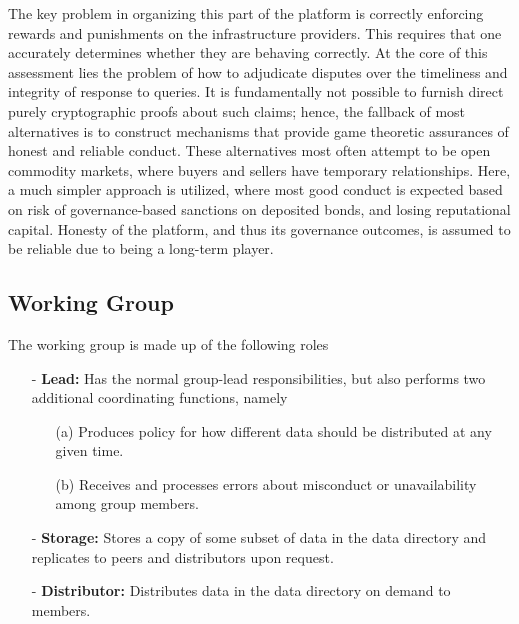 \documentclass{article}
\begin{document}
The key problem in organizing this part of the platform is correctly enforcing rewards and punishments on the infrastructure providers. This requires that one accurately determines whether they are behaving correctly. At the core of this assessment lies the problem of how to adjudicate disputes over the timeliness and integrity of response to queries. It is fundamentally not possible to furnish direct purely cryptographic proofs about such claims; hence, the fallback of most alternatives is to construct mechanisms that provide game theoretic assurances of honest and reliable conduct. These alternatives most often attempt to be open commodity markets, where buyers and sellers have temporary relationships. Here, a much simpler approach is utilized, where most good conduct is expected based on risk of governance-based sanctions on deposited bonds, and losing reputational capital. Honesty of the platform, and thus its governance outcomes, is assumed to be reliable due to being a long-term player.

\subsection{Working Group}

The working group is made up of the following roles

\begin{itemize}

  \item[-] \textbf{Lead:} Has the normal group-lead responsibilities, but also performs two additional coordinating functions, namely

      \begin{itemize}

      \item[(a)] Produces policy for how different data should be distributed at any given time.

      \item[(b)] Receives and processes errors about misconduct or unavailability among group members.

      \end{itemize}

  \item[-] \textbf{Storage:} Stores a copy of some subset of data in the data directory and replicates to peers and distributors upon request.

  \item[-] \textbf{Distributor:} Distributes data in the data directory on demand to members.

\end{itemize}
\end{document}
